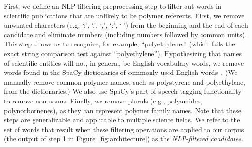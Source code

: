 First, we define an
NLP filtering preprocessing step to filter out
words in scientific publications that are unlikely to be polymer referents. 
First, we remove
unwanted characters (e.g. `:', `.', `,', `:', `-') from the beginning and the end of each
candidate and eliminate numbers (including numbers followed by common units).
This step allows us to recognize, for example, ``polyethylene;'' (which fails the
exact string comparison test against ``polyethylene'').
Hypothesizing that names of scientific entities will not, in general, be English
vocabulary words, we remove words found in the SpaCy dictionaries
of commonly used English words~\cite{choi2015depends}. (We manually remove common polymer
names, such as polystyrene and polyethylene, from the dictionaries.) 
We also use
SpaCy's part-of-speech tagging functionality to remove non-nouns.  
Finally, we remove plurals (e.g.,
polyamides, polynorbornenes), as they can represent polymer family names.
Note that these steps are generalizable and applicable to multiple science fields.
We refer to the set of words that result when these filtering operations are applied to our corpus (the output of step 1 in Figure~\ref{fig:architecture}) as the \emph{NLP-filtered candidates}.


